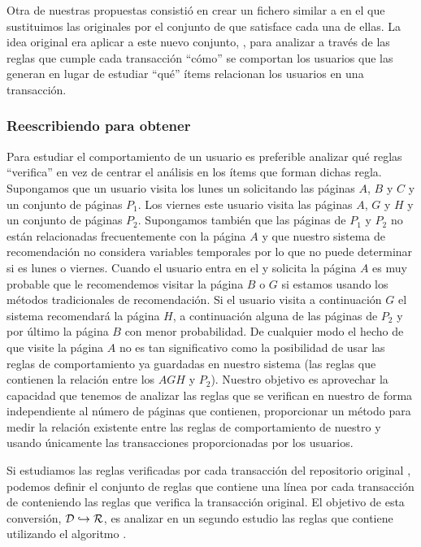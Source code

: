
Otra de nuestras propuestas consistió en crear un fichero similar a \D en el que sustituimos las \transacciones originales por el conjunto de \ars que satisface cada una de ellas. La idea original era aplicar \apriori a este nuevo conjunto, \R, para analizar a través de las reglas que cumple cada transacción "`cómo"' se comportan los usuarios que las generan en lugar de estudiar "`qué"' ítems relacionan los usuarios en una transacción.

\subsubsection{Reescribiendo \D para obtener \R}
Para estudiar el comportamiento de un usuario es preferible analizar qué reglas "`verifica"' en vez de centrar el análisis en los ítems que forman dichas regla. Supongamos que un usuario visita los lunes un \portalWeb solicitando las páginas $A$, $B$ y $C$ y un conjunto de páginas $P_1$. Los viernes este usuario visita las páginas $A$, $G$ y $H$ y un conjunto de páginas $P_2$. Supongamos también que las páginas de $P_1$ y $P_2$ no están relacionadas frecuentemente con la página $A$ y que nuestro sistema de recomendación no considera variables temporales por lo que no puede determinar si es lunes o viernes. Cuando el usuario entra en el \portalWeb y solicita la página $A$ es muy probable que le recomendemos visitar la página $B$ o $G$ si estamos usando los métodos tradicionales de recomendación. Si el usuario visita a continuación $G$ el sistema recomendará la página $H$, a continuación alguna de las páginas de $P_2$ y por último la página $B$ con menor probabilidad. De cualquier modo el hecho de que visite la página $A$ no es tan significativo como la posibilidad de usar las reglas de comportamiento ya guardadas en nuestro sistema (las reglas que contienen la relación entre los \kitemsets $AGH$ y $P_2$). Nuestro objetivo es aprovechar la capacidad que tenemos de analizar las reglas que se verifican en nuestro \portalWeb de forma independiente al número de páginas que contienen, proporcionar un método para medir la relación existente entre las reglas de comportamiento de nuestro \portalWeb y usando únicamente las transacciones proporcionadas por los usuarios.

Si estudiamos las reglas verificadas por cada transacción del repositorio original \D, podemos definir el conjunto de reglas \R que contiene una línea por cada transacción de \D conteniendo las reglas que verifica la transacción original. El objetivo de esta conversión, $\D\hookrightarrow\R$, es analizar en un segundo estudio las reglas que contiene \R utilizando el algoritmo \apriori.

